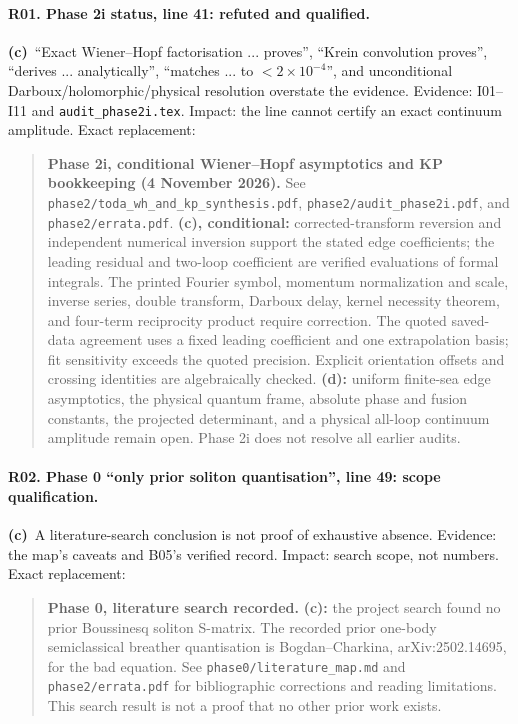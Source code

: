 \documentclass[11pt,a4paper]{article}
\newcommand{\C}{\textbf{(c)}\ }
\newcommand{\file}[1]{\nolinkurl{#1}}
\begin{document}
\paragraph{R01. Phase 2i status, line 41: refuted and qualified.}
\C ``Exact Wiener--Hopf factorisation ... proves'', ``Krein convolution
proves'', ``derives ... analytically'', ``matches ... to $<2\times10^{-4}$'',
and unconditional Darboux/holomorphic/physical resolution overstate the evidence.
Evidence: I01--I11 and \file{audit_phase2i.tex}. Impact: the line cannot certify
an exact continuum amplitude. Exact replacement:
\begin{quote}
\textbf{Phase 2i, conditional Wiener--Hopf asymptotics and KP bookkeeping
(4 November 2026).} See \file{phase2/toda_wh_and_kp_synthesis.pdf},
\file{phase2/audit_phase2i.pdf}, and \file{phase2/errata.pdf}.
\textbf{(c), conditional:} corrected-transform reversion and independent
numerical inversion support the stated edge coefficients; the leading
residual and two-loop coefficient are verified evaluations of formal
integrals. The printed Fourier symbol, momentum normalization and scale,
inverse series, double transform, Darboux delay, kernel necessity theorem,
and four-term reciprocity product require correction. The quoted saved-data
agreement uses a fixed leading coefficient and one extrapolation basis;
fit sensitivity exceeds the quoted precision. Explicit orientation offsets
and crossing identities are algebraically checked. \textbf{(d):} uniform
finite-sea edge asymptotics, the physical quantum frame, absolute phase and
fusion constants, the projected determinant, and a physical all-loop
continuum amplitude remain open. Phase 2i does not resolve all earlier audits.
\end{quote}

\paragraph{R02. Phase 0 ``only prior soliton quantisation'', line 49: scope qualification.}
\C A literature-search conclusion is not proof of exhaustive absence.
Evidence: the map's caveats and B05's verified record. Impact: search scope,
not numbers. Exact replacement:
\begin{quote}
\textbf{Phase 0, literature search recorded.} \textbf{(c):} the project
search found no prior Boussinesq soliton S-matrix. The recorded prior
one-body semiclassical breather quantisation is Bogdan--Charkina,
arXiv:2502.14695, for the bad equation. See \file{phase0/literature_map.md}
and \file{phase2/errata.pdf} for bibliographic corrections and reading
limitations. This search result is not a proof that no other prior work exists.
\end{quote}
\end{document}
